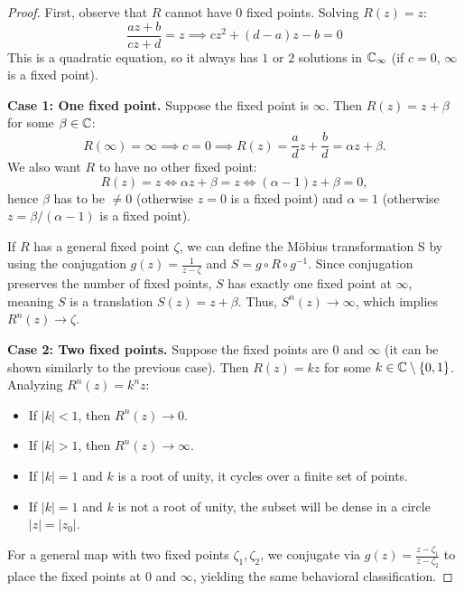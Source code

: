 \begin{proof}
    First, observe that $R$ cannot have $0$ fixed points. Solving $R(z) = z$:
    \begin{equation*}
        \frac{az+b}{cz+d} = z \implies cz^2 + (d-a)z - b = 0
    \end{equation*}
    This is a quadratic equation, so it always has $1$ or $2$ solutions in
    $\mathbb{C}_\infty$ (if $c=0$, $\infty$ is a fixed point). 

    \textbf{Case 1: One fixed point.} Suppose the fixed point is $\infty$. Then
    $R(z) = z + \beta$ for some $\beta \in \mathbb{C}$:
    \begin{equation*}
        R(\infty) = \infty \implies c=0 \implies R(z) = \frac{a}{d}z + \frac{b}{d} = \alpha z + \beta.
    \end{equation*}
    We also want $R$ to have no other fixed point:
    \begin{equation*}
        R(z) = z \iff \alpha z + \beta = z \iff (\alpha - 1)z + \beta = 0,
    \end{equation*}
    hence $\beta$ has to be $\neq 0$ (otherwise $z=0$ is a fixed point) and
    $\alpha=1$ (otherwise $z=\beta/(\alpha-1)$ is a fixed point).
    
    If $R$ has a general fixed point $\zeta$, we can define the Möbius
    transformation S by using the conjugation $g(z) = \frac{1}{z-\zeta}$ and $S
    = g \circ R \circ g^{-1}$. Since conjugation preserves the number of fixed
    points, $S$ has exactly one fixed point at $\infty$, meaning $S$ is a
    translation $S(z) = z + \beta$. Thus, $S^n(z) \to \infty$, which implies
    $R^n(z) \to \zeta$.

    \textbf{Case 2: Two fixed points.} Suppose the fixed points are $0$ and
    $\infty$ (it can be shown similarly to the previous case). Then $R(z) = k z$
    for some $k \in \mathbb{C} \setminus \{0, 1\}$. Analyzing $R^n(z) = k^n z$:
    \begin{itemize}
        \item If $|k| < 1$, then $R^n(z) \to 0$.
        \item If $|k| > 1$, then $R^n(z) \to \infty$.
        \item If $|k| = 1$ and $k$ is a root of unity, it cycles over a finite
        set of points.
        \item If $|k| = 1$ and $k$ is not a root of unity, the subset will be
        dense in a circle $|z| = |z_0|$.
    \end{itemize}
    For a general map with two fixed points $\zeta_1, \zeta_2$, we conjugate via
    $g(z) = \frac{z-\zeta_1}{z-\zeta_2}$ to place the fixed points at $0$ and
    $\infty$, yielding the same behavioral classification.
\end{proof}

